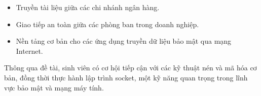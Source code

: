 \begin{itemize}
  \item Truyền tài liệu giữa các chi nhánh ngân hàng.
  \item Giao tiếp an toàn giữa các phòng ban trong doanh nghiệp.
  \item Nền tảng cơ bản cho các ứng dụng truyền dữ liệu bảo mật qua mạng Internet.
\end{itemize}

Thông qua đề tài, sinh viên có cơ hội tiếp cận với các kỹ thuật nén và mã hóa cơ bản, đồng thời thực hành lập trình socket, một kỹ năng quan trọng trong lĩnh vực bảo mật và mạng máy tính.

